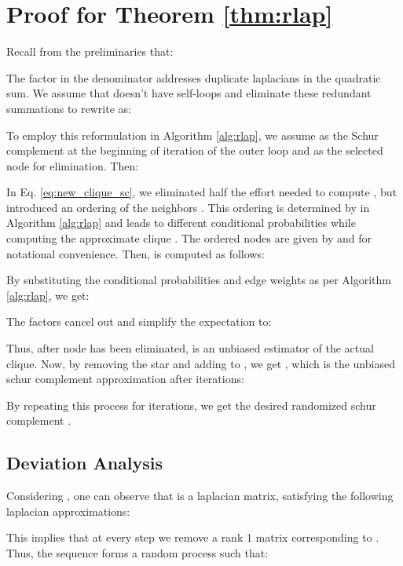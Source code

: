 \documentclass{article}
\theoremstyle{plain}
\theoremstyle{definition}
\theoremstyle{remark}
\begin{document}
\section{Proof for Theorem \ref{thm:rlap}}
\label{app:poc_rlap}

Recall from the preliminaries that: 


The factor  in the denominator addresses duplicate laplacians in the quadratic sum. We assume that  doesn't have self-loops and eliminate these redundant summations to rewrite  as:


To employ this reformulation in Algorithm \ref{alg:rlap}, we assume  as the Schur complement at the beginning of  iteration of the outer loop and  as the selected node for elimination. Then:






In Eq. \ref{eq:new_clique_sc}, we eliminated half the effort needed to compute , but introduced an ordering of the neighbors . This ordering is determined by  in Algorithm \ref{alg:rlap} and leads to different conditional probabilities  while computing the approximate clique . The ordered nodes are given by  and  for notational convenience. Then,  is computed as follows:



By substituting the conditional probabilities and edge weights as per Algorithm \ref{alg:rlap}, we get:



The factors cancel out and simplify the expectation to:




Thus, after node  has been eliminated,  is an unbiased estimator of the actual clique. Now, by removing the star and adding  to , we get , which is the unbiased schur complement approximation after  iterations:

By repeating this process for  iterations, we get the desired randomized schur complement .

\subsection{Deviation Analysis}

Considering , one can observe that  is a laplacian matrix, satisfying the following laplacian approximations:



This implies that at every step we remove a rank 1 matrix corresponding to . Thus, the sequence  forms a random process such that:
\end{document}
